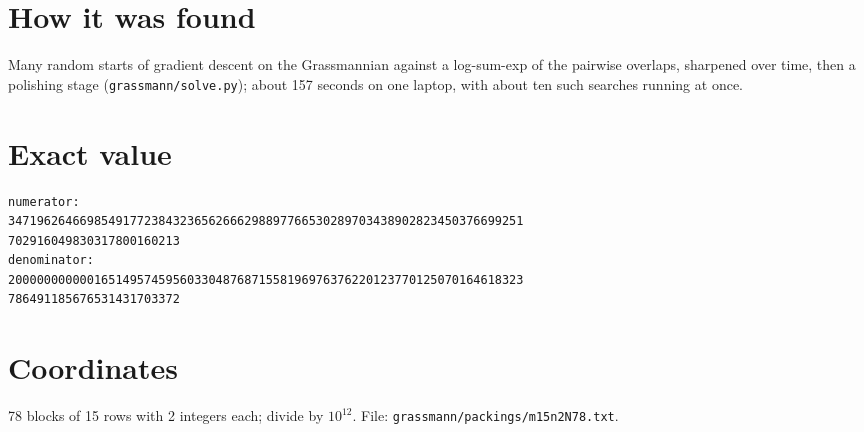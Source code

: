 \documentclass[11pt,a4paper]{article}
\begin{document}
\section{How it was found}
Many random starts of gradient descent on the Grassmannian against a log-sum-exp of the pairwise overlaps, sharpened over time, then a polishing stage (\texttt{grassmann/solve.py}); about 157 seconds on one laptop, with about ten such searches running at once.


\appendix
\section{Exact value}
{\small
\begin{verbatim}
numerator:
347196264669854917723843236562666298897766530289703438902823450376699251
702916049830317800160213
denominator:
200000000000165149574595603304876871558196976376220123770125070164618323
786491185676531431703372
\end{verbatim}}

\section{Coordinates}
78 blocks of 15 rows with 2 integers each; divide by $10^{12}$. File: \texttt{grassmann/packings/m15n2N78.txt}.
{\tiny
\begin{multicols}{4}
\end{multicols}}
\end{document}
